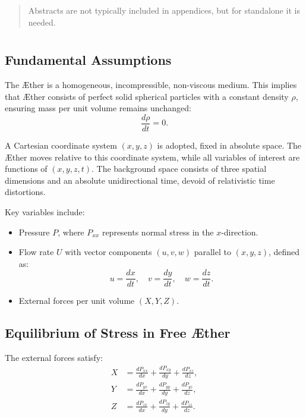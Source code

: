 \documentclass[12pt]{article}
\begin{document}
    \titlepageOpen

    \begin{abstract}
        Abstracts are not typically included in appendices, but for standalone it is needed.
    \end{abstract}

    \titlepageClose
    \fi

    \section{\appendixtitle}


    \subsection*{Fundamental Assumptions}
    The Æther is a homogeneous, incompressible, non-viscous medium. This implies that Æther consists of perfect solid spherical particles with a constant density $\rho$, ensuring mass per unit volume remains unchanged:
    \begin{equation*}
        \frac{d \rho}{d t} = 0.
    \end{equation*}

    A Cartesian coordinate system $(x, y, z)$ is adopted, fixed in absolute space. The Æther moves relative to this coordinate system, while all variables of interest are functions of $(x, y, z, t)$. The background space consists of three spatial dimensions and an absolute unidirectional time, devoid of relativistic time distortions.

    Key variables include:
    \begin{itemize}
        \item Pressure $P$, where $P_{xx}$ represents normal stress in the $x$-direction.
        \item Flow rate $U$ with vector components $(u, v, w)$ parallel to $(x, y, z)$, defined as:
        \begin{equation*}
            u = \frac{dx}{dt}, \quad v = \frac{dy}{dt}, \quad w = \frac{dz}{dt}.
        \end{equation*}
        \item External forces per unit volume $(X, Y, Z)$.
    \end{itemize}

    \subsection*{Equilibrium of Stress in Free Æther}
    The external forces satisfy:
    \begin{align}
        X &= \frac{d P_{xx}}{dx} + \frac{d P_{xy}}{dy} + \frac{d P_{xz}}{dz}, \\
        Y &= \frac{d P_{yx}}{dx} + \frac{d P_{yy}}{dy} + \frac{d P_{yz}}{dz}, \\
        Z &= \frac{d P_{zx}}{dx} + \frac{d P_{zy}}{dy} + \frac{d P_{zz}}{dz}.
    \end{align}
\end{document}
